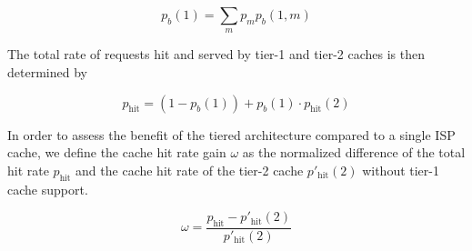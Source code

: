 \begin{equation}
	p_b(1) = \sum_m p_m p_{b}(1,m)
\end{equation}

The total rate of requests hit and served by tier-1 and tier-2 caches is then determined by

\begin{equation}
	p_\text{hit} = (1-p_b(1)) + p_b(1)\cdot p_\text{hit}(2)
\end{equation}

In order to assess the benefit of the tiered architecture compared to a single ISP cache, we define the cache hit rate gain $\omega$ as the normalized difference of the total hit rate $p_\text{hit}$ and the cache hit rate of the tier-2 cache $p'_\text{hit}(2)$ without tier-1 cache support.

\begin{equation}
\omega = \frac{p_\text{hit}-p'_\text{hit}(2)}{p'_\text{hit}(2)}
\end{equation}


